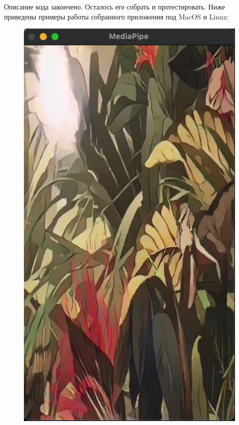 \documentclass[a4paper,14pt]{extreport}
\begin{document}
        Описание кода закончено. Осталось его собрать и протестировать. Ниже приведены примеры работы собранного приложения под MacOS и Linux:
        \begin{figure}[h]
            \begin{center}
                \begin{minipage}[h]{0.4\linewidth}
                    \includegraphics[width=1\linewidth]{images-code/Linux.png}

\end{minipage}
\end{center}
\end{figure}
\end{document}
